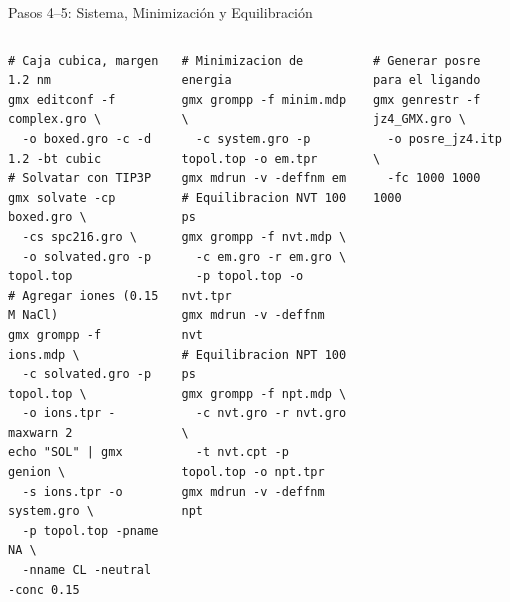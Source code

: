 \documentclass[aspectratio=169, 10pt]{beamer}
\begin{document}
\begin{frame}[fragile,shrink=5]{Pasos 4--5: Sistema, Minimización y Equilibración}
\begin{columns}[T]
\begin{tcolorbox}[definitionbox, title={4. Caja, solvatación e iones}]
\begin{lstlisting}[style=bashstyle]
# Caja cubica, margen 1.2 nm
gmx editconf -f complex.gro \
  -o boxed.gro -c -d 1.2 -bt cubic
# Solvatar con TIP3P
gmx solvate -cp boxed.gro \
  -cs spc216.gro \
  -o solvated.gro -p topol.top
# Agregar iones (0.15 M NaCl)
gmx grompp -f ions.mdp \
  -c solvated.gro -p topol.top \
  -o ions.tpr -maxwarn 2
echo "SOL" | gmx genion \
  -s ions.tpr -o system.gro \
  -p topol.top -pname NA \
  -nname CL -neutral -conc 0.15
\end{lstlisting}
\end{tcolorbox}
\column{0.47\textwidth}
\begin{tcolorbox}[formulabox, title={5. EM, NVT y NPT}]
\begin{lstlisting}[style=bashstyle]
# Minimizacion de energia
gmx grompp -f minim.mdp \
  -c system.gro -p topol.top -o em.tpr
gmx mdrun -v -deffnm em
# Equilibracion NVT 100 ps
gmx grompp -f nvt.mdp \
  -c em.gro -r em.gro \
  -p topol.top -o nvt.tpr
gmx mdrun -v -deffnm nvt
# Equilibracion NPT 100 ps
gmx grompp -f npt.mdp \
  -c nvt.gro -r nvt.gro \
  -t nvt.cpt -p topol.top -o npt.tpr
gmx mdrun -v -deffnm npt
\end{lstlisting}
\end{tcolorbox}
\begin{tcolorbox}[warningbox, title={Restricciones del ligando}]
\begin{lstlisting}[style=bashstyle]
# Generar posre para el ligando
gmx genrestr -f jz4_GMX.gro \
  -o posre_jz4.itp \
  -fc 1000 1000 1000
\end{lstlisting}
\end{tcolorbox}
\end{columns}
\end{frame}
\end{document}

